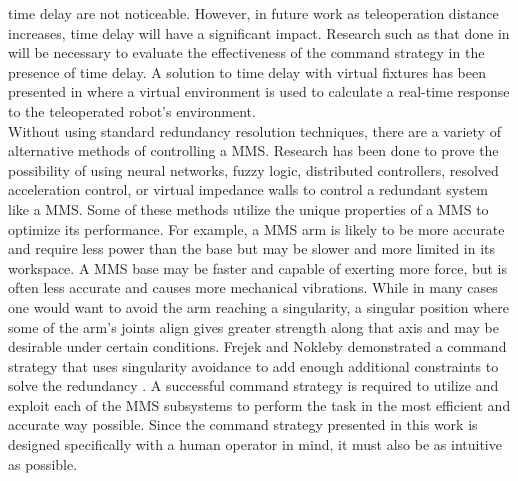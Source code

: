 \documentclass[onecolumn,10pt,final]{asme2ej}
\begin{document}
time delay are not noticeable. However, in future work as teleoperation distance increases, time delay will have a significant impact. Research such as that done in \cite{lag} will be necessary to evaluate the effectiveness of the command strategy in the presence of time delay. A solution to time delay with virtual fixtures has been presented in \cite{lagfix} where a virtual environment is used to calculate a real-time response to the teleoperated robot's environment.\\

Without using standard redundancy resolution techniques, there are a variety of alternative methods of controlling a MMS. Research has been done to prove the possibility of using neural networks\cite{gao,goldenberg,zalzala}, fuzzy logic\cite{soylu}, distributed controllers\cite{hung}, resolved acceleration control\cite{keigo}, or virtual impedance walls\cite{takubo} to control a redundant system like a MMS. Some of these methods utilize the unique properties of a MMS to optimize its performance. For example, a MMS arm is likely to be more accurate and require less power than the base but may be slower and more limited in its workspace. A MMS base may be faster and capable of exerting more force, but is often less accurate and causes more mechanical vibrations. While in many cases one would want to avoid the arm reaching a singularity, a singular position where some of the arm's joints align gives greater strength along that axis and may be desirable under certain conditions. Frejek and Nokleby demonstrated a command strategy that uses singularity avoidance to add enough additional constraints to solve the redundancy \cite{frejek}. A successful command strategy is required to utilize and exploit each of the MMS subsystems to perform the task in the most efficient and accurate way possible. Since the command strategy presented in this work is designed specifically with a human operator in mind, it must also be as intuitive as possible.\\
\end{document}
